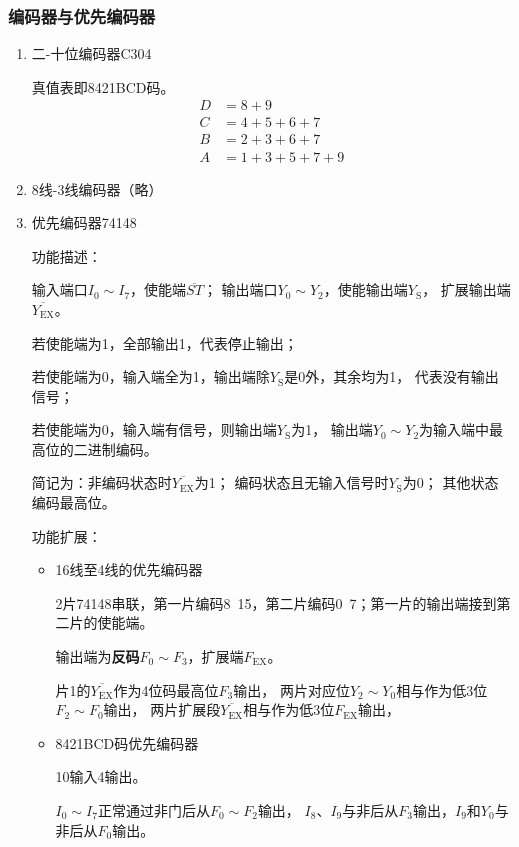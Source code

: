 \documentclass[UTF8,fontset=fandol,zihao=5]{ctexart}
\begin{document}
\subsubsection{编码器与优先编码器}

\begin{enumerate}
  \item 二-十位编码器C304
  
  真值表即8421BCD码。
  \[
  \begin{aligned}
  D &= 8+9\\
  C &= 4+5+6+7\\
  B &= 2+3+6+7\\
  A &= 1+3+5+7+9
  \end{aligned}
  \]

  \item 8线-3线编码器（略）
  \item 优先编码器74148
  
  功能描述：
  
  输入端口$I_0\sim I_7$，使能端$\overline{ST}$；
  输出端口$Y_0\sim Y_2$，使能输出端$Y_{\mathrm{S}}$，
  扩展输出端$\overline{Y_{\mathrm{EX}}}$。

  若使能端为1，全部输出1，代表停止输出；
  
  若使能端为0，输入端全为1，输出端除$Y_{\mathrm{S}}$是0外，其余均为1，
  代表没有输出信号；

  若使能端为0，输入端有信号，则输出端$Y_{\mathrm{S}}$为1，
  输出端$Y_0\sim Y_2$为输入端中最高位的二进制编码。

  简记为：非编码状态时$\overline{Y_{\mathrm{EX}}}$为1；
  编码状态且无输入信号时$Y_{\mathrm{S}}$为0；
  其他状态编码最高位。

  功能扩展：
  \begin{itemize}
    \item 16线至4线的优先编码器
    
    2片74148串联，第一片编码8~15，第二片编码0~7；第一片的输出端接到第二片的使能端。

    输出端为\textbf{反码}$F_0\sim F_3$，扩展端$F_{\mathrm{EX}}$。

    片1的$\overline{Y_{\mathrm{EX}}}$作为4位码最高位$F_3$输出，
    两片对应位$Y_2\sim Y_0$相与作为低3位$F_2\sim F_0$输出，
    两片扩展段$\overline{Y_{\mathrm{EX}}}$相与作为低3位$F_{\mathrm{EX}}$输出，

    \item 8421BCD码优先编码器
    
    10输入4输出。

    $I_0\sim I_7$正常通过非门后从$F_0\sim F_2$输出，
    $I_8$、$I_9$与非后从$F_3$输出，$I_9$和$Y_0$与非后从$F_0$输出。
  \end{itemize}
\end{enumerate}
\end{document}
